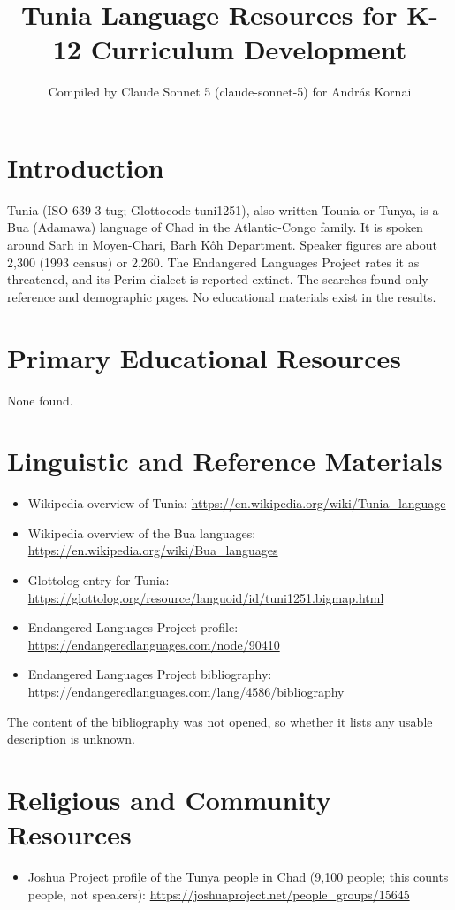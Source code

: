 \documentclass[12pt]{article}
\title{Tunia Language Resources for K-12 Curriculum Development}
\author{Compiled by Claude Sonnet 5 (claude-sonnet-5) for Andr\'as Kornai}
\date{}
\begin{document}
\maketitle

\section{Introduction}
Tunia (ISO 639-3 tug; Glottocode tuni1251), also written Tounia or Tunya, is a Bua (Adamawa) language of Chad in the Atlantic-Congo family. It is spoken around Sarh in Moyen-Chari, Barh Kôh Department. Speaker figures are about 2,300 (1993 census) or 2,260. The Endangered Languages Project rates it as threatened, and its Perim dialect is reported extinct. The searches found only reference and demographic pages. No educational materials exist in the results.

\section{Primary Educational Resources}
None found.

\section{Linguistic and Reference Materials}
\begin{itemize}
\item Wikipedia overview of Tunia: \url{https://en.wikipedia.org/wiki/Tunia_language}
\item Wikipedia overview of the Bua languages: \url{https://en.wikipedia.org/wiki/Bua_languages}
\item Glottolog entry for Tunia: \url{https://glottolog.org/resource/languoid/id/tuni1251.bigmap.html}
\item Endangered Languages Project profile: \url{https://endangeredlanguages.com/node/90410}
\item Endangered Languages Project bibliography: \url{https://endangeredlanguages.com/lang/4586/bibliography}
\end{itemize}
The content of the bibliography was not opened, so whether it lists any usable description is unknown.

\section{Religious and Community Resources}
\begin{itemize}
\item Joshua Project profile of the Tunya people in Chad (9,100 people; this counts people, not speakers): \url{https://joshuaproject.net/people_groups/15645}
\end{itemize}
\end{document}

